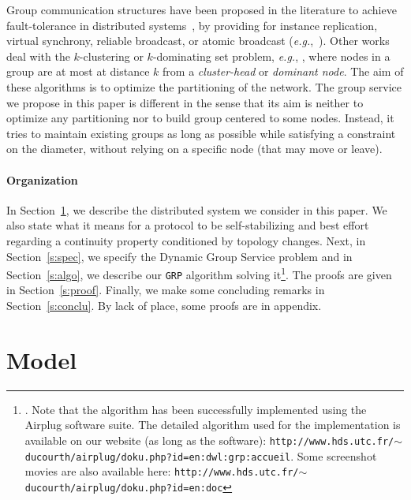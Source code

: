 \documentclass[11pt,english]{article}
\newcommand{\Latin}[1]{\textit{#1}}
\newcommand{\eg}{\Latin{e.g.},\xspace}
\begin{document}
Group communication structures have been proposed in the literature to achieve
fault-tolerance in distributed systems~\cite{ACM93}, by providing for instance
replication, virtual synchrony, reliable broadcast, or atomic broadcast
(\emph{e.g.},~\cite{S90,GS97}).
Other works deal with the $k$-clustering or $k$-dominating set problem, \eg
\cite{APHV00,CKV01,Demirbas06,Johnen09,KM06c,KP98,PB04}, where nodes in a group are at
most at distance $k$ from a \emph{cluster-head} or \emph{dominant node}. The aim
of these algorithms is to optimize the partitioning of the network.
The group service we propose in this paper is different in the sense that its aim is neither to
optimize any partitioning nor to build group centered to some nodes. Instead, it
tries to maintain existing groups as long as possible while satisfying a
constraint on the diameter, without relying on a specific node (that may move or
leave).


\paragraph{Organization}
In Section~\ref{s:model}, we describe the distributed system we consider in this
paper. We also state what it means for a protocol to be self-stabilizing and
best effort regarding a continuity property conditioned by topology changes.
Next, in Section~\ref{s:spec}, we specify the Dynamic Group Service problem and
in Section~\ref{s:algo}, we describe our \texttt{GRP} algorithm solving it\footnote{\label{refonline}.  Note that the algorithm has been successfully implemented using the
  Airplug software suite. The detailed algorithm used for the implementation is
  available on our website (as long as the software):\newline \noindent
{\tt http://www.hds.utc.fr/$\sim$ducourth/airplug/doku.php?id=en:dwl:grp:accueil}.
Some screenshot movies are also available here:\newline \noindent
{\tt http://www.hds.utc.fr/$\sim$ducourth/airplug/doku.php?id=en:doc}
}.
The proofs are given in Section~\ref{s:proof}. Finally, we make some
concluding remarks in Section~\ref{s:conclu}.
By lack of place, some proofs are in appendix.





\section{Model}\label{s:model}
\end{document}
